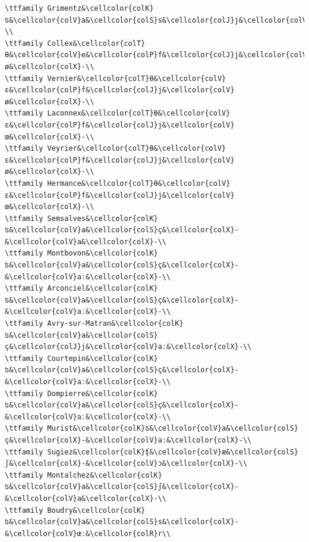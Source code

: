 \begin{verbatim}
\ttfamily Grimentz&\cellcolor{colK}ʦ&\cellcolor{colV}a&\cellcolor{colS}s&\cellcolor{colJ}j&\cellcolor{colV}ou&\cellcolor{colX}-\\
\ttfamily Collex&\cellcolor{colT}θ&\cellcolor{colV}e&\cellcolor{colP}f&\cellcolor{colJ}j&\cellcolor{colV}ø&\cellcolor{colX}-\\
\ttfamily Vernier&\cellcolor{colT}θ&\cellcolor{colV}ɛ&\cellcolor{colP}f&\cellcolor{colJ}j&\cellcolor{colV}ø&\cellcolor{colX}-\\
\ttfamily Laconnex&\cellcolor{colT}θ&\cellcolor{colV}ɛ&\cellcolor{colP}f&\cellcolor{colJ}j&\cellcolor{colV}œ&\cellcolor{colX}-\\
\ttfamily Veyrier&\cellcolor{colT}θ&\cellcolor{colV}ɛ&\cellcolor{colP}f&\cellcolor{colJ}j&\cellcolor{colV}ø&\cellcolor{colX}-\\
\ttfamily Hermance&\cellcolor{colT}θ&\cellcolor{colV}ɛ&\cellcolor{colP}f&\cellcolor{colJ}j&\cellcolor{colV}œ&\cellcolor{colX}-\\
\ttfamily Semsalves&\cellcolor{colK}ʦ&\cellcolor{colV}a&\cellcolor{colS}ç&\cellcolor{colX}-&\cellcolor{colV}a&\cellcolor{colX}-\\
\ttfamily Montbovon&\cellcolor{colK}ʦ&\cellcolor{colV}a&\cellcolor{colS}ç&\cellcolor{colX}-&\cellcolor{colV}aː&\cellcolor{colX}-\\
\ttfamily Arconciel&\cellcolor{colK}ʦ&\cellcolor{colV}a&\cellcolor{colS}ç&\cellcolor{colX}-&\cellcolor{colV}aː&\cellcolor{colX}-\\
\ttfamily Avry-sur-Matran&\cellcolor{colK}ʦ&\cellcolor{colV}a&\cellcolor{colS}ç&\cellcolor{colJ}j&\cellcolor{colV}aː&\cellcolor{colX}-\\
\ttfamily Courtepin&\cellcolor{colK}ʦ&\cellcolor{colV}a&\cellcolor{colS}ç&\cellcolor{colX}-&\cellcolor{colV}aː&\cellcolor{colX}-\\
\ttfamily Dompierre&\cellcolor{colK}ʦ&\cellcolor{colV}a&\cellcolor{colS}ç&\cellcolor{colX}-&\cellcolor{colV}aː&\cellcolor{colX}-\\
\ttfamily Murist&\cellcolor{colK}ʦ&\cellcolor{colV}a&\cellcolor{colS}ç&\cellcolor{colX}-&\cellcolor{colV}aː&\cellcolor{colX}-\\
\ttfamily Sugiez&\cellcolor{colK}ʧ&\cellcolor{colV}æ&\cellcolor{colS}ʃ&\cellcolor{colX}-&\cellcolor{colV}ɔ&\cellcolor{colX}-\\
\ttfamily Montalchez&\cellcolor{colK}ʦ&\cellcolor{colV}a&\cellcolor{colS}ʃ&\cellcolor{colX}-&\cellcolor{colV}a&\cellcolor{colX}-\\
\ttfamily Boudry&\cellcolor{colK}ʦ&\cellcolor{colV}a&\cellcolor{colS}s&\cellcolor{colX}-&\cellcolor{colV}œː&\cellcolor{colR}r\\

\end{verbatim}
